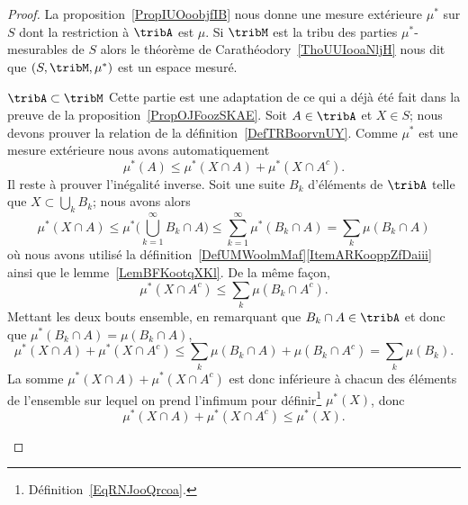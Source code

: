 \begin{proof}
    La proposition~\ref{PropIUOoobjfIB} nous donne une mesure extérieure \( \mu^*\) sur \( S\) dont la restriction à \( \tribA\) est \( \mu\). Si \( \tribM\) est la tribu des parties \( \mu^*\)-mesurables de \( S\) alors le théorème de Carathéodory~\ref{ThoUUIooaNljH} nous dit que \( (S,\tribM,\mu^*)\) est un espace mesuré.
    \begin{subproof}
        \item[\( \tribA\subset\tribM\)]
            Cette partie est une adaptation de ce qui a déjà été fait dans la preuve de la proposition~\ref{PropOJFoozSKAE}. Soit \( A\in\tribA\) et \( X\in S\); nous devons prouver la relation de la définition~\ref{DefTRBoorvnUY}. Comme \( \mu^*\) est une mesure extérieure nous avons automatiquement
            \begin{equation}
                \mu^*(A)\leq \mu^*(X\cap A)+\mu^*(X\cap A^c).
            \end{equation}
            Il reste à prouver l'inégalité inverse. Soit une suite \( B_k\) d'éléments de \( \tribA\) telle que \( X\subset\bigcup_kB_k\); nous avons alors
            \begin{equation}
                \mu^*(X\cap A)\leq \mu^*\big( \bigcup_{k=1}^{\infty}B_k\cap A \big)\leq \sum_{k=1}^{\infty}\mu^*(B_k\cap A)=\sum_k\mu(B_k\cap A)
            \end{equation}
            où nous avons utilisé la définition~\ref{DefUMWoolmMaf}\ref{ItemARKooppZfDaiii} ainsi que le lemme~\ref{LemBFKootqXKl}. De la même façon,
            \begin{equation}
                \mu^*(X\cap A^c)\leq \sum_k\mu(B_k\cap A^c).
            \end{equation}
            Mettant les deux bouts ensemble, en remarquant que \( B_k\cap A\in\tribA\) et donc que \( \mu^*(B_k\cap A)=\mu(B_k\cap A)\),
            \begin{equation}
                \mu^*(X\cap A)+\mu^*(X\cap A^c)\leq \sum_k\mu(B_k\cap A)+\mu(B_k\cap A^c)=\sum_k\mu(B_k).
            \end{equation}
            La somme \( \mu^*(X\cap A)+\mu^*(X\cap A^c)\) est donc inférieure à chacun des éléments de l'ensemble sur lequel on prend l'infimum pour définir\footnote{Définition~\ref{EqRNJooQrcoa}.} \( \mu^*(X)\), donc
            \begin{equation}
                 \mu^*(X\cap A)+\mu^*(X\cap A^c)\leq \mu^*(X).
            \end{equation}
    \end{subproof}


\end{proof}

